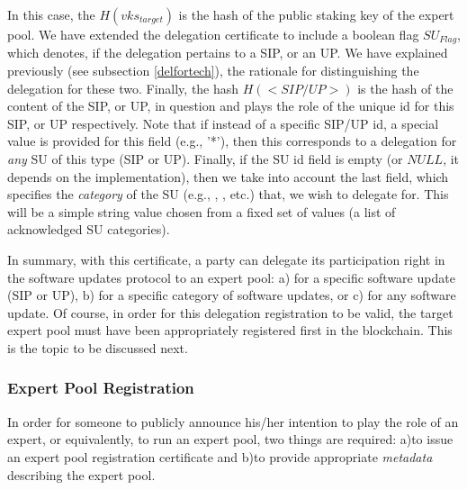 In this case, the $H(vks_{target})$ is the hash of the public staking key of the expert pool. We have extended the delegation certificate to include a boolean flag $SU_{Flag}$, which denotes, if the delegation pertains to a SIP, or an UP. We have explained previously (see subsection \ref{delfortech}), the rationale for distinguishing the delegation for these two. Finally, the hash $H(<SIP/UP>)$ is the hash of the content of the SIP, or UP, in question and plays the role of the unique id for this SIP, or UP respectively. Note that if instead of a specific SIP/UP id, a special value is provided for this field (e.g., '*'), then this corresponds to a delegation for \emph{any} SU of this type (SIP or UP). Finally, if the SU id field is empty (or $NULL$, it depends on the implementation), then we take into account the last field, which specifies the \emph{category} of the SU (e.g., , , etc.) that, we wish to delegate for. This will be a simple string value chosen from a fixed set of values (a list of acknowledged SU categories).

In summary, with this certificate, a party can delegate its participation right in the software updates protocol to an expert pool: a) for a specific software update (SIP or UP), b) for a specific category of software updates, or c) for any software update. Of course, in order for this delegation registration to be valid, the target expert pool must have been appropriately registered first in the blockchain. This is the topic to be discussed next.

\subsubsection*{Expert Pool Registration}
In order for someone to publicly announce his/her intention to play the role of an expert, or equivalently, to run an expert pool, two things are required: a)to issue an expert pool registration certificate and b)to provide appropriate \emph{metadata} describing the expert pool.

